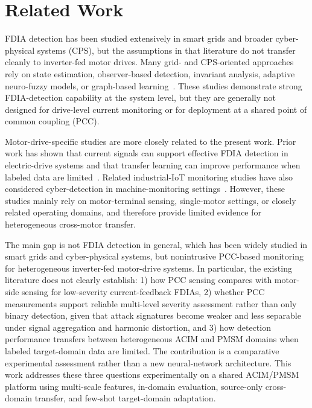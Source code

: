 \documentclass[letterpaper,journal]{IEEEtran}
\begin{document}
\section{Related Work}
\label{sec:relatedWorks}

FDIA detection has been studied extensively in smart grids and broader cyber-physical systems (CPS), but the assumptions in that literature do not transfer cleanly to inverter-fed motor drives. Many grid- and CPS-oriented approaches rely on state estimation, observer-based detection, invariant analysis, adaptive neuro-fuzzy models, or graph-based learning~\cite{7438916,basati2022fdi,nath2022quickest,beg2017fdia,sargolzaei2020fdia,10016905}. These studies demonstrate strong FDIA-detection capability at the system level, but they are generally not designed for drive-level current monitoring or for deployment at a shared point of common coupling (PCC).

Motor-drive-specific studies are more closely related to the present work. Prior work has shown that current signals can support effective FDIA detection in electric-drive systems and that transfer learning can improve performance when labeled data are limited~\cite{Yang2022Fast,Yang2024Enhanced}. Related industrial-IoT monitoring studies have also considered cyber-detection in machine-monitoring settings~\cite{423563247547}. However, these studies mainly rely on motor-terminal sensing, single-motor settings, or closely related operating domains, and therefore provide limited evidence for heterogeneous cross-motor transfer.


The main gap is not FDIA detection in general, which has been widely studied in smart grids and cyber-physical systems, but nonintrusive PCC-based monitoring for heterogeneous inverter-fed motor-drive systems. In particular, the existing literature does not clearly establish: 1) how PCC sensing compares with motor-side sensing for low-severity current-feedback FDIAs, 2) whether PCC measurements support reliable multi-level severity assessment rather than only binary detection, given that attack signatures become weaker and less separable under signal aggregation and harmonic distortion, and 3) how detection performance transfers between heterogeneous ACIM and PMSM domains when labeled target-domain data are limited. The contribution is a comparative experimental assessment rather than a new neural-network architecture. This work addresses these three questions experimentally on a shared ACIM/PMSM platform using multi-scale features, in-domain evaluation, source-only cross-domain transfer, and few-shot target-domain adaptation.
\end{document}
